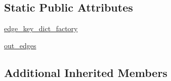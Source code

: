 \subsection*{Static Public Attributes}
\begin{DoxyCompactItemize}
\item 
\hyperlink{classnetworkx_1_1classes_1_1multidigraph_1_1MultiDiGraph_a66859606fcc9511a1efc1e568cd1dd9c}{edge\+\_\+key\+\_\+dict\+\_\+factory}
\item 
\hyperlink{classnetworkx_1_1classes_1_1multidigraph_1_1MultiDiGraph_a0a1bb8ff16b097a11b11a770998ad0e2}{out\+\_\+edges}
\end{DoxyCompactItemize}
\subsection*{Additional Inherited Members}


